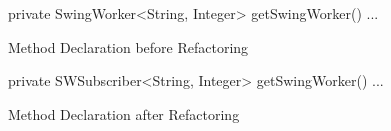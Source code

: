 \begin{figure}[H]
\begin{minipage}{0.48\textwidth}
\begin{sourcecode}
\begin{javacode}{1}
private SwingWorker<String, Integer> 
	getSwingWorker(){ ... }
\end{javacode}
\caption{Method Declaration before Refactoring}
\label{code:md-before}
\end{sourcecode}
\end{minipage}\hspace{0.7cm}
\begin{minipage}{0.48\textwidth}
\begin{sourcecode}
\begin{javacode}{1}
private SWSubscriber<String, Integer> 
	getSwingWorker(){ ... }
\end{javacode}
\caption{Method Declaration after Refactoring}
\label{code:md-after}
\end{sourcecode}
\end{minipage}
\end{figure}